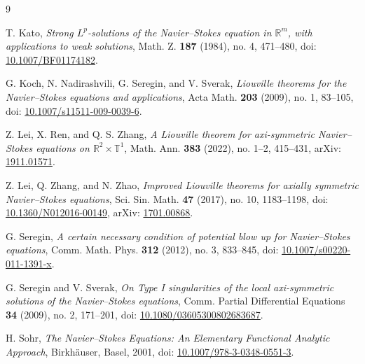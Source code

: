 \documentclass[11pt]{amsart}
\theoremstyle{plain}
\theoremstyle{definition}
\theoremstyle{remark}
\numberwithin{equation}{section}
\begin{document}
\begin{thebibliography}{9}

T. Kato,
\emph{Strong \(L^p\)-solutions of the Navier--Stokes equation in
\(\mathbb R^m\), with applications to weak solutions},
Math. Z. \textbf{187} (1984), no. 4, 471--480,
doi: \href{https://doi.org/10.1007/BF01174182}
{10.1007/BF01174182}.

G. Koch, N. Nadirashvili, G. Seregin, and V. Sverak,
\emph{Liouville theorems for the Navier--Stokes equations and applications},
Acta Math. \textbf{203} (2009), no. 1, 83--105,
doi: \href{https://doi.org/10.1007/s11511-009-0039-6}
{10.1007/s11511-009-0039-6}.

Z. Lei, X. Ren, and Q. S. Zhang,
\emph{A Liouville theorem for axi-symmetric Navier--Stokes equations on
\(\mathbb R^2\times\mathbb T^1\)},
Math. Ann. \textbf{383} (2022), no. 1--2, 415--431,
arXiv: \href{https://arxiv.org/abs/1911.01571}{1911.01571}.

Z. Lei, Q. Zhang, and N. Zhao,
\emph{Improved Liouville theorems for axially symmetric Navier--Stokes
equations},
Sci. Sin. Math. \textbf{47} (2017), no. 10, 1183--1198,
doi: \href{https://doi.org/10.1360/N012016-00149}
{10.1360/N012016-00149},
arXiv: \href{https://arxiv.org/abs/1701.00868}{1701.00868}.

G. Seregin,
\emph{A certain necessary condition of potential blow up for Navier--Stokes
equations},
Comm. Math. Phys. \textbf{312} (2012), no. 3, 833--845,
doi: \href{https://doi.org/10.1007/s00220-011-1391-x}
{10.1007/s00220-011-1391-x}.

G. Seregin and V. Sverak,
\emph{On Type I singularities of the local axi-symmetric solutions of the
Navier--Stokes equations},
Comm. Partial Differential Equations \textbf{34} (2009), no. 2, 171--201,
doi: \href{https://doi.org/10.1080/03605300802683687}
{10.1080/03605300802683687}.

H. Sohr,
\emph{The Navier--Stokes Equations: An Elementary Functional Analytic
Approach},
Birkh\"auser, Basel, 2001,
doi: \href{https://doi.org/10.1007/978-3-0348-0551-3}
{10.1007/978-3-0348-0551-3}.

\end{thebibliography}
\end{document}
